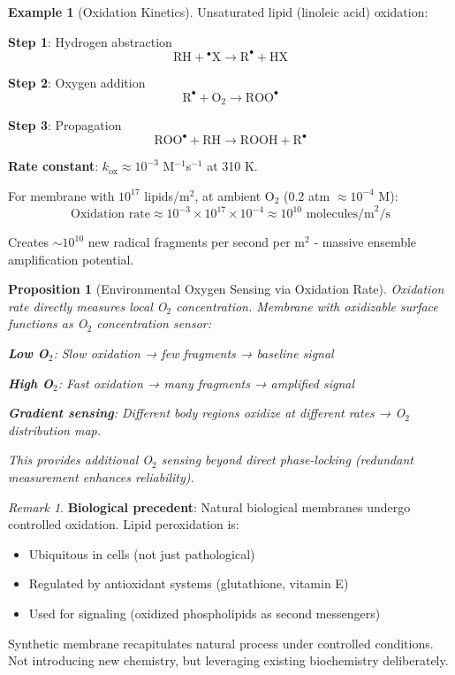 \documentclass[11pt,a4paper]{article}
\newtheorem{proposition}[theorem]{Proposition}
\theoremstyle{definition}
\newtheorem{example}[theorem]{Example}
\theoremstyle{remark}
\newtheorem{remark}[theorem]{Remark}
\begin{document}
\begin{example}[Oxidation Kinetics]
Unsaturated lipid (linoleic acid) oxidation:

\textbf{Step 1}: Hydrogen abstraction
\begin{equation}
\text{RH} + {}^\bullet\text{X} \rightarrow \text{R}^\bullet + \text{HX}
\end{equation}

\textbf{Step 2}: Oxygen addition
\begin{equation}
\text{R}^\bullet + \text{O}_2 \rightarrow \text{ROO}^\bullet
\end{equation}

\textbf{Step 3}: Propagation
\begin{equation}
\text{ROO}^\bullet + \text{RH} \rightarrow \text{ROOH} + \text{R}^\bullet
\end{equation}

\textbf{Rate constant}: $k_{\text{ox}} \approx 10^{-3}$ M$^{-1}$s$^{-1}$ at 310 K.

For membrane with $10^{17}$ lipids/m$^2$, at ambient O$_2$ (0.2 atm $\approx 10^{-4}$ M):
\begin{equation}
\text{Oxidation rate} \approx 10^{-3} \times 10^{17} \times 10^{-4} \approx 10^{10} \text{ molecules/m}^2\text{/s}
\end{equation}

Creates $\sim 10^{10}$ new radical fragments per second per m$^2$ - massive ensemble amplification potential.
\end{example}

\begin{proposition}[Environmental Oxygen Sensing via Oxidation Rate]
Oxidation rate directly measures local O$_2$ concentration. Membrane with oxidizable surface functions as O$_2$ concentration sensor:

\textbf{Low O$_2$}: Slow oxidation → few fragments → baseline signal

\textbf{High O$_2$}: Fast oxidation → many fragments → amplified signal

\textbf{Gradient sensing}: Different body regions oxidize at different rates → O$_2$ distribution map.

This provides \textit{additional} O$_2$ sensing beyond direct phase-locking (redundant measurement enhances reliability).
\end{proposition}

\begin{remark}
\textbf{Biological precedent}: Natural biological membranes undergo controlled oxidation. Lipid peroxidation is:
\begin{itemize}
\item Ubiquitous in cells (not just pathological)
\item Regulated by antioxidant systems (glutathione, vitamin E)
\item Used for signaling (oxidized phospholipids as second messengers)
\end{itemize}

Synthetic membrane recapitulates natural process under controlled conditions. Not introducing new chemistry, but leveraging existing biochemistry deliberately.
\end{remark}
\end{document}

